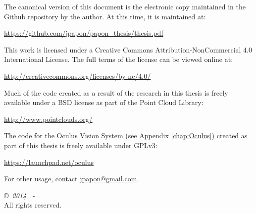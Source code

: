 \newpage \thispagestyle{empty} \vspace*{\fill}
 
\noindent 

\textsc{  }
\begin{flushleft}
The canonical version of this document is the electronic copy maintained in the Github repository by the author. At this time, it is maintained at:\
\end{flushleft}
\begin{center} \url{https://github.com/jpapon/papon_thesis/thesis.pdf} \\ \end{center}

\begin{flushleft}
This work is licensed under a Creative Commons Attribution-NonCommercial 4.0 International License. The full terms of the license can be viewed online at:\
\end{flushleft}
\begin{center} \url{http://creativecommons.org/licenses/by-nc/4.0/} \\ \end{center}

\begin{flushleft}
Much of the code created as a result of the research in this thesis is freely available under a BSD license as part of the Point Cloud Library:\
\end{flushleft}
\begin{center} \url{http://www.pointclouds.org/} \\ \end{center}


\begin{flushleft}
The code for the Oculus Vision System (see Appendix \ref{chap:Oculus}) created as part of this thesis is freely available under GPLv3:\
\end{flushleft}
\begin{center} \url{https://launchpad.net/oculus} \\ \end{center}

\vspace{20pt}
\begin{center} For other usage, contact \url{jpapon@gmail.com}. \end{center}
\vspace{40pt}

\begin{center}
\begin{textsc}
\copyright~\textit{2014 \hspace{3pt}~- \theauthor} \\ 
\noindent All rights reserved.
\end{textsc}
\end{center}

